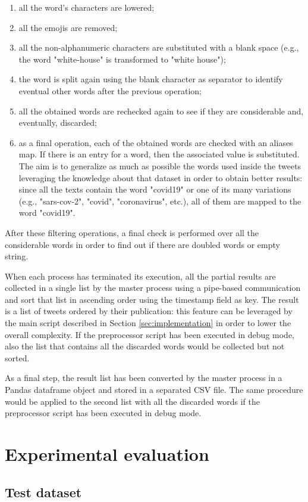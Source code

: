 \begin{description}
	\begin{enumerate}
		\item all the word's characters are lowered;
		\item all the emojis are removed;
		\item all the non-alphanumeric characters are substituted with a blank space (e.g., the word "white-house" is transformed to "white house");
		\item the word is split again using the blank character as separator to identify eventual other words after the previous operation;
		\item all the obtained words are rechecked again to see if they are considerable and, eventually, discarded;
		\item as a final operation, each of the obtained words are checked with an aliases map. If there is an entry for a word, then the associated value is substituted. The aim is to generalize as much as possible the words used inside the tweets leveraging the knowledge about that dataset in order to obtain better results: since all the texts contain the word "covid19" or one of its many variations (e.g., "sars-cov-2", "covid", "coronavirus", etc.), all of them are mapped to the word "covid19".
	\end{enumerate}
	After these filtering operations, a final check is performed over all the considerable words in order to find out if there are doubled words or empty string. 
\end{description}

When each process has terminated its execution, all the partial results are collected in a single list by the master process using a pipe-based communication and sort that list in ascending order using the timestamp field as key. The result is a list of tweets ordered by their publication: this feature can be leveraged by the main script described in Section \ref{sec:implementation} in order to lower the overall complexity. If the preprocessor script has been executed in debug mode, also the list that contains all the discarded words would be collected but not sorted.

As a final step, the result list has been converted by the master process in a Pandas \cite{python-pandas} dataframe object and stored in a separated CSV file. The same procedure would be applied to the second list with all the discarded words if the preprocessor script has been executed in debug mode.

\section{Experimental evaluation}
\label{sec:experimental_evaluation}

\subsection{Test dataset}
\label{subsec:test_dataset}
